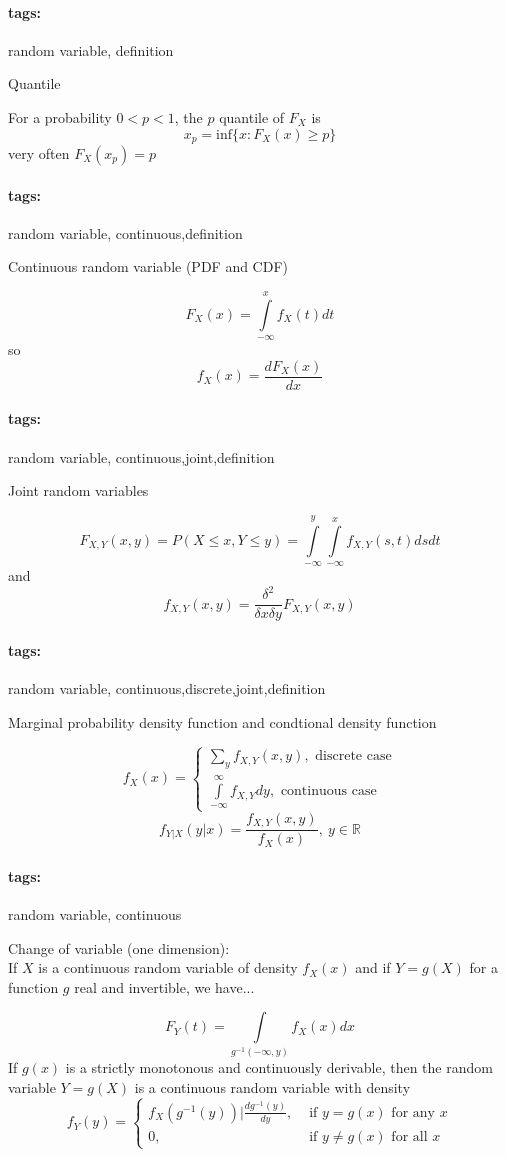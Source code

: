\documentclass[12pt]{article}
\newcommand*{\xfield}[1]{\begin{mdframed}\centering #1\end{mdframed}\bigskip}
\newenvironment{note}{}{}
\newcommand*{\tags}[1]{\paragraph{tags: }#1}
\begin{document}
\begin{note}
	\tags{random variable, definition}
	\xfield{Quantile} %
	\xfield{For a probability $0<p<1$, the $p$ quantile of $F_X$ is 
$$x_p = \text{inf}\lbrace x: F_X(x) \ge p \rbrace$$
very often $F_X(x_p) = p$} %
\end{note}

\begin{note}
	\tags{random variable, continuous,definition}
	\xfield{Continuous random variable (PDF and CDF)} %
	\xfield{$$F_X(x) = \int\limits_{-\infty}^x f_X(t) dt$$
so
$$f_X(x) = \frac{dF_X(x)}{dx}$$} %
\end{note}

\begin{note}
	\tags{random variable, continuous,joint,definition}
	\xfield{Joint random variables} %
	\xfield{$$F_{X,Y}(x,y) = P(X \le x, Y \le y) = \int\limits_{-\infty}^y
    \int\limits_{-\infty}^x f_{X,Y}(s,t)ds dt$$
    and
$$f_{X,Y}(x,y)=\frac{\delta^2}{\delta x \delta y}F_{X,Y}(x,y)$$} %
\end{note}

\begin{note}
	\tags{random variable, continuous,discrete,joint,definition}
	\xfield{Marginal probability density function and condtional density function} %
	\xfield{$$f_X(x) = \begin{cases} \sum\limits_y f_{X,Y}(x,y),\text{ discrete
        case}\\
      \int\limits_{-\infty}^{\infty}f_{X,Y}dy,\text{ continuous case}
\end{cases}$$
$$f_{Y|X}(y|x) = \frac{f_{X,Y}(x,y)}{f_X(x)},\ y \in \mathbb{R}$$} %
\end{note}

\begin{note}
	\tags{random variable, continuous}
	\xfield{Change of variable (one dimension):\\
If $X$ is a continuous random variable of density $f_X(x)$ and if
    $Y=g(X)$ for a function $g$ real and invertible, we have...} %
	\xfield{$$F_Y(t) = \int\limits_{g^{-1}(-\infty,y)}f_X(x)dx$$
If $g(x)$ is a strictly monotonous and continuously derivable, then the random
variable $Y=g(X)$ is a continuous random variable with density
$$f_Y(y) = \begin{cases}
f_X(g^{-1}(y))|\frac{d g^{-1}(y)}{dy}, &\text{ if $y=g(x)$ for any $x$}\\
0,&\text{ if $y \neq g(x)$ for all $x$}
\end{cases}$$
    } %
\end{note}
\end{document}
